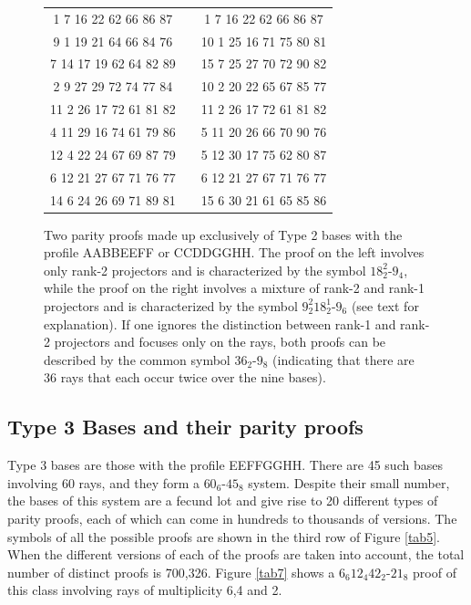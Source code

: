 \begin{figure}[ht]
\centering %
\begin{tabular}{|c | c |c |} %
\hline %
1	7	16	22	62	66	86	87& &1 7	16	22	62	66	86	87  \\
9	1	19	21	64	66	84	76& &10 1	25	16	71	75	80	81  \\
7	14	17	19	62	64	82	89& &15 7	25	27	70	72	90	82 \\
2	9	27	29	72	74	77	84& &10 2	20	22	65	67	85	77 \\
11	2	26	17	72	61	81	82& &11 2	26	17	72	61	81	82 \\
4	11	29	16	74	61	79	86& &5 11	20	26	66	70	90	76  \\
12	4	22	24	67	69	87	79& &5 12	30	17	75	62	80	87  \\
6	12	21	27	67	71	76	77& &6 12	21	27	67	71	76	77  \\
14	6	24	26	69	71	89	81& &15 6	30	21	61	65	85	86  \\
\hline
\end{tabular}
\caption{Two parity proofs made up exclusively of Type 2 bases with the profile AABBEEFF or CCDDGGHH. The proof on the left involves only rank-2 projectors and is characterized by the symbol $18^{2}_{2}$-$9_{4}$, while the proof on the right involves a mixture of rank-2 and rank-1 projectors and is characterized by the symbol $9^{2}_{2}18^{1}_{2}$-$9_{6}$ (see text for explanation). If one ignores the distinction between rank-1 and rank-2 projectors and focuses only on the rays, both proofs can be described by the common symbol $36_{2}$-$9_{8}$ (indicating that there are 36 rays that each occur twice over the nine bases).}
\label{tab6}
\end{figure}

{\bf \subsection{\label{subsec:type3} Type 3 Bases and their parity proofs }}

Type 3 bases are those with the profile EEFFGGHH. There are 45 such bases involving 60 rays, and they form a $60_{6}$-$45_{8}$ system. Despite their small number, the bases of this system are a fecund lot and give rise to 20 different types of parity proofs, each of which can come in hundreds to thousands of versions. The symbols of all the possible proofs are shown in the third row of Figure \ref{tab5}. When the different versions of each of the proofs are taken into account, the total number of distinct proofs is 700,326. Figure \ref{tab7} shows a $6_{6}12_{4}42_{2}$-$21_{8}$ proof of this class involving rays of multiplicity 6,4 and 2.\\

